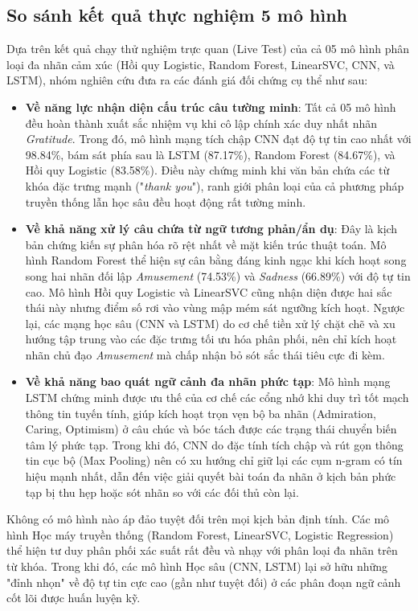 \subsection{So sánh kết quả thực nghiệm 5 mô hình}

Dựa trên kết quả chạy thử nghiệm trực quan (Live Test) của cả 05 mô hình phân loại đa nhãn cảm xúc (Hồi quy Logistic, Random Forest, LinearSVC, CNN, và LSTM), nhóm nghiên cứu đưa ra các đánh giá đối chứng cụ thể như sau:
\begin{itemize}
	\item \textbf{Về năng lực nhận diện cấu trúc câu tường minh}: Tất cả 05 mô hình đều hoàn thành xuất sắc nhiệm vụ khi cô lập chính xác duy nhất nhãn \textit{Gratitude}. Trong đó, mô hình mạng tích chập CNN đạt độ tự tin cao nhất với 98.84\%, bám sát phía sau là LSTM (87.17\%), Random Forest (84.67\%), và Hồi quy Logistic (83.58\%). Điều này chứng minh khi văn bản chứa các từ khóa đặc trưng mạnh ("\textit{thank you}"), ranh giới phân loại của cả phương pháp truyền thống lẫn học sâu đều hoạt động rất tường minh.
	
	\item \textbf{Về khả năng xử lý câu chứa từ ngữ tương phản/ẩn dụ}: Đây là kịch bản chứng kiến sự phân hóa rõ rệt nhất về mặt kiến trúc thuật toán. Mô hình Random Forest thể hiện sự cân bằng đáng kinh ngạc khi kích hoạt song song hai nhãn đối lập \textit{Amusement} (74.53\%) và \textit{Sadness} (66.89\%) với độ tự tin cao. Mô hình Hồi quy Logistic và LinearSVC cũng nhận diện được hai sắc thái này nhưng điểm số rơi vào vùng mập mém sát ngưỡng kích hoạt. Ngược lại, các mạng học sâu (CNN và LSTM) do cơ chế tiền xử lý chặt chẽ và xu hướng tập trung vào các đặc trưng tối ưu hóa phân phối, nên chỉ kích hoạt nhãn chủ đạo \textit{Amusement} mà chấp nhận bỏ sót sắc thái tiêu cực đi kèm.
	
	\item \textbf{Về khả năng bao quát ngữ cảnh đa nhãn phức tạp}: Mô hình mạng LSTM chứng minh được ưu thế của cơ chế các cổng nhớ khi duy trì tốt mạch thông tin tuyến tính, giúp kích hoạt trọn vẹn bộ ba nhãn (Admiration, Caring, Optimism) ở câu chúc và bóc tách được các trạng thái chuyển biến tâm lý phức tạp. Trong khi đó, CNN do đặc tính tích chập và rút gọn thông tin cục bộ (Max Pooling) nên có xu hướng chỉ giữ lại các cụm n-gram có tín hiệu mạnh nhất, dẫn đến việc giải quyết bài toán đa nhãn ở kịch bản phức tạp bị thu hẹp hoặc sót nhãn so với các đối thủ còn lại.
\end{itemize}

Không có mô hình nào áp đảo tuyệt đối trên mọi kịch bản định tính. Các mô hình Học máy truyền thống (Random Forest, LinearSVC, Logistic Regression) thể hiện tư duy phân phối xác suất rất đều và nhạy với phân loại đa nhãn trên từ khóa. Trong khi đó, các mô hình Học sâu (CNN, LSTM) lại sở hữu những "đỉnh nhọn" về độ tự tin cực cao (gần như tuyệt đối) ở các phân đoạn ngữ cảnh cốt lõi được huấn luyện kỹ.